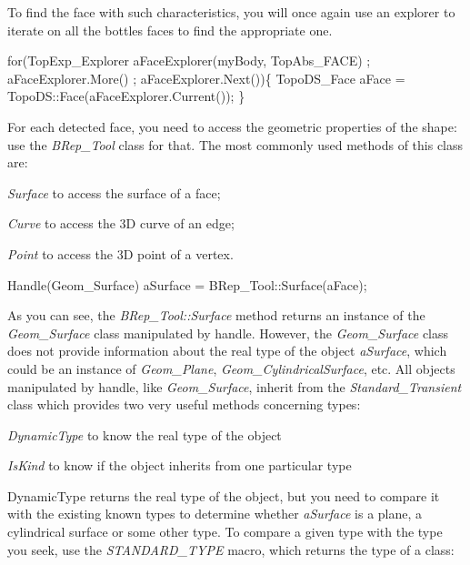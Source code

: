 To find the face with such characteristics, you will once again use an explorer to iterate on all the bottle\textquotesingle{}s faces to find the appropriate one.


\begin{DoxyCode}
\textcolor{keywordflow}{for}(TopExp\_Explorer aFaceExplorer(myBody, TopAbs\_FACE) ; aFaceExplorer.More() ; aFaceExplorer.Next())\{
    TopoDS\_Face aFace = TopoDS::Face(aFaceExplorer.Current());
\}
\end{DoxyCode}


For each detected face, you need to access the geometric properties of the shape\+: use the {\itshape B\+Rep\+\_\+\+Tool} class for that. The most commonly used methods of this class are\+:


\begin{DoxyItemize}
\item {\itshape Surface} to access the surface of a face;
\item {\itshape Curve} to access the 3D curve of an edge;
\item {\itshape Point} to access the 3D point of a vertex.
\end{DoxyItemize}


\begin{DoxyCode}
Handle(Geom\_Surface) aSurface = BRep\_Tool::Surface(aFace);
\end{DoxyCode}


As you can see, the {\itshape B\+Rep\+\_\+\+Tool\+::\+Surface} method returns an instance of the {\itshape Geom\+\_\+\+Surface} class manipulated by handle. However, the {\itshape Geom\+\_\+\+Surface} class does not provide information about the real type of the object {\itshape a\+Surface}, which could be an instance of {\itshape Geom\+\_\+\+Plane}, {\itshape Geom\+\_\+\+Cylindrical\+Surface}, etc. All objects manipulated by handle, like {\itshape Geom\+\_\+\+Surface}, inherit from the {\itshape Standard\+\_\+\+Transient} class which provides two very useful methods concerning types\+:


\begin{DoxyItemize}
\item {\itshape Dynamic\+Type} to know the real type of the object
\item {\itshape Is\+Kind} to know if the object inherits from one particular type
\end{DoxyItemize}

Dynamic\+Type returns the real type of the object, but you need to compare it with the existing known types to determine whether {\itshape a\+Surface} is a plane, a cylindrical surface or some other type. To compare a given type with the type you seek, use the {\itshape S\+T\+A\+N\+D\+A\+R\+D\+\_\+\+T\+Y\+PE} macro, which returns the type of a class\+:


